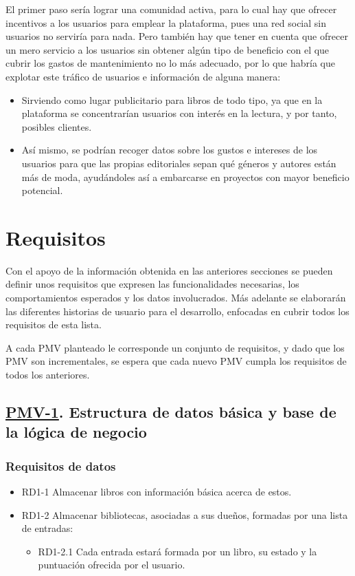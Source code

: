 El primer paso sería lograr una comunidad activa, para lo cual hay que ofrecer incentivos a los usuarios para emplear la plataforma, pues una red social sin usuarios no serviría para nada. Pero también hay que tener en cuenta que ofrecer un mero servicio a los usuarios sin obtener algún tipo de beneficio con el que cubrir los gastos de mantenimiento no lo más adecuado, por lo que habría que explotar este tráfico de usuarios e información de alguna manera:

\begin{itemize}
    \item Sirviendo como lugar publicitario para libros de todo tipo, ya que en la plataforma se concentrarían usuarios con interés en la lectura, y por tanto, posibles clientes.
    \item Así mismo, se podrían recoger datos sobre los gustos e intereses de los usuarios para que las propias editoriales sepan qué géneros y autores están más de moda, ayudándoles así a embarcarse en proyectos con mayor beneficio potencial.
\end{itemize} 

\section{Requisitos}

Con el apoyo de la información obtenida en las anteriores secciones se pueden definir unos requisitos que expresen las funcionalidades necesarias, los comportamientos esperados y los datos involucrados. Más adelante se elaborarán las diferentes historias de usuario para el desarrollo, enfocadas en cubrir todos los requisitos de esta lista.

A cada PMV planteado le corresponde un conjunto de requisitos, y dado que los PMV son incrementales, se espera que cada nuevo PMV cumpla los requisitos de todos los anteriores.

\subsection{\href{https://github.com/Anglepi/My-Many-Reads/milestone/2}{PMV-1}. Estructura de datos básica y base de la lógica de negocio}

\subsubsection{Requisitos de datos}
\begin{itemize}
    \item RD1-1 Almacenar libros con información básica acerca de estos.
    \item RD1-2 Almacenar bibliotecas, asociadas a sus dueños, formadas por una lista de entradas:
    \begin{itemize}
        \item RD1-2.1 Cada entrada estará formada por un libro, su estado y la puntuación ofrecida por el usuario.
    \end{itemize}
\end{itemize}

